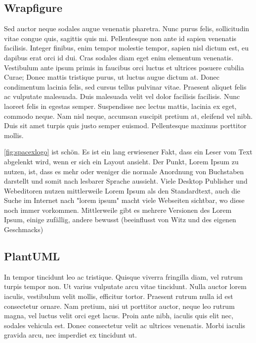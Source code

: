 \documentclass[%
    auto-generate   = true,             %
    debug           = true,             %
    print-ndn       = true,             %
    print-loa       = true,             %
    print-lof       = true,             %
    print-lot       = true,             %
    print-lol       = true,             %
    bib-file        = literature.bib,   %
    plantuml        = true              %
]{udhbwvst}
\begin{document}
\subsection{Wrapfigure}

Sed auctor neque sodales augue venenatis pharetra. Nunc purus felis, sollicitudin vitae congue quis, sagittis quis mi. Pellentesque non ante id sapien venenatis facilisis. Integer finibus, enim tempor molestie tempor, sapien nisl dictum est, eu dapibus erat orci id dui. Cras sodales diam eget enim elementum venenatis. Vestibulum ante ipsum primis in faucibus orci luctus et ultrices posuere cubilia Curae; Donec mattis tristique purus, ut luctus augue dictum at. Donec condimentum lacinia felis, sed cursus tellus pulvinar vitae. Praesent aliquet felis ac vulputate malesuada. Duis malesuada velit vel dolor facilisis facilisis. Nunc laoreet felis in egestas semper. Suspendisse nec lectus mattis, lacinia ex eget, commodo neque. Nam nisl neque, accumsan suscipit pretium at, eleifend vel nibh. Duis sit amet turpis quis justo semper euismod. Pellentesque maximus porttitor mollis. 


\autoref{fig:spacexlogo} ist schön. Es ist ein lang erwiesener Fakt, dass ein Leser vom Text abgelenkt wird, wenn er sich ein Layout ansieht. Der Punkt, Lorem Ipsum zu nutzen, ist, dass es mehr oder weniger die normale Anordnung von Buchstaben darstellt und somit nach lesbarer Sprache aussieht. Viele Desktop Publisher und Webeditoren nutzen mittlerweile Lorem Ipsum als den Standardtext, auch die Suche im Internet nach "lorem ipsum" macht viele Webseiten sichtbar, wo diese noch immer vorkommen. Mittlerweile gibt es mehrere Versionen des Lorem Ipsum, einige zufällig, andere bewusst (beeinflusst von Witz und des eigenen Geschmacks)

\subsection{PlantUML}

In tempor tincidunt leo ac tristique. Quisque viverra fringilla diam, vel rutrum turpis tempor non. Ut varius vulputate arcu vitae tincidunt. Nulla auctor lorem iaculis, vestibulum velit mollis, efficitur tortor. Praesent rutrum nulla id est consectetur ornare. Nam pretium, nisi ut porttitor auctor, neque leo rutrum magna, vel luctus velit orci eget lacus. Proin ante nibh, iaculis quis elit nec, sodales vehicula est. Donec consectetur velit ac ultrices venenatis. Morbi iaculis gravida arcu, nec imperdiet ex tincidunt ut. 
\end{document}
